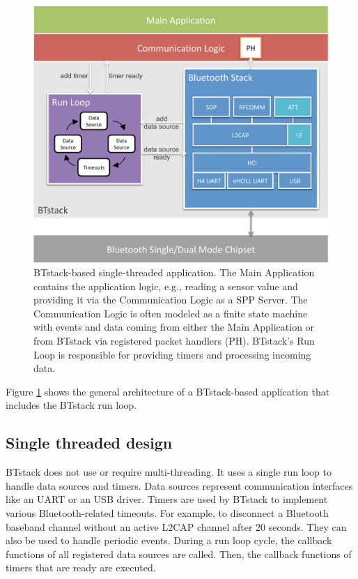 \documentclass[a4paper,titlepage,oneside,12pt]{amsart} %
\begin{document}
\begin{figure}[htbp] %
   \centering
   \includegraphics[width=\textwidth]{picts/btstack-architecture.pdf} 
   \caption{BTstack-based single-threaded application. The Main Application contains the application logic, e.g., reading a sensor value and providing it via the Communication Logic as a SPP Server.
    The Communication Logic is often modeled as a finite state machine with events and data coming from either the Main Application or from BTstack via registered  packet handlers (PH).   
    BTstack's Run Loop is responsible for providing timers and processing incoming data.
}
    
   \label{fig:BTstackArchitecture}
\end{figure}

Figure \ref{fig:BTstackArchitecture} shows the general architecture of a BTstack-based application that includes the BTstack run loop.

\subsection{Single threaded design}
BTstack does not use or require multi-threading. It uses a single run loop to handle data sources and timers. Data sources represent communication interfaces like an UART or an USB driver. 
Timers are used by BTstack to implement various Bluetooth-related timeouts. For example, to disconnect a Bluetooth baseband channel without an active L2CAP channel after 20 seconds. They can also be used to handle periodic events. During a run loop cycle, the callback functions of all registered data sources are called. Then, the callback functions of timers that are ready are executed. 
\end{document}
